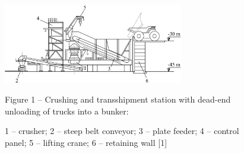 \begin{figure}[H]
	\centering
	\includegraphics[width=0.7\textwidth]{assets/1350}
	\caption*{Figure 1 -- Crushing and transshipment station with dead-end unloading of trucks into a bunker:}
	\caption*{1 -- crusher; 2 -- steep belt conveyor; 3 -- plate feeder; 4 -- control panel; 5 -- lifting crane; 6 -- retaining wall {[}1{]}}
\end{figure}

